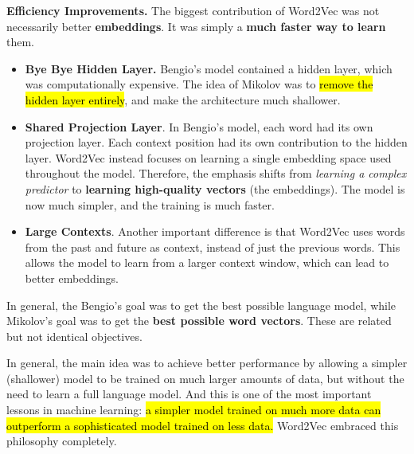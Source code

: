 \highspace
\textcolor{Green3}{ \textbf{Efficiency Improvements.}} The biggest contribution of Word2Vec was not necessarily better \textbf{embeddings}. It was simply a \textbf{much faster way to learn} them.
\begin{itemize}
    \item \textbf{Bye Bye Hidden Layer.} Bengio's model contained a hidden layer, which was computationally expensive. The idea of Mikolov was to \hl{remove the hidden layer entirely}, and make the architecture much shallower.
    

    \item \textbf{Shared Projection Layer}. In Bengio's model, each word had its own projection layer. Each context position had its own contribution to the hidden layer. Word2Vec instead focuses on learning a single embedding space used throughout the model. Therefore, the emphasis shifts from \emph{learning a complex predictor} to \textbf{learning high-quality vectors} (the embeddings). The model is now much simpler, and the training is much faster.
    

    \item \textbf{Large Contexts}. Another important difference is that Word2Vec uses words from the past and future as context, instead of just the previous words. This allows the model to learn from a larger context window, which can lead to better embeddings.
\end{itemize}
In general, the Bengio's goal was to get the best possible language model, while Mikolov's goal was to get the \textbf{best possible word vectors}. These are related but not identical objectives.

\highspace
In general, the main idea was to achieve better performance by allowing a simpler (shallower) model to be trained on much larger amounts of data, but without the need to learn a full language model. And this is one of the most important lessons in machine learning: \hl{a simpler model trained on much more data can outperform a sophisticated model trained on less data.} Word2Vec embraced this philosophy completely.
